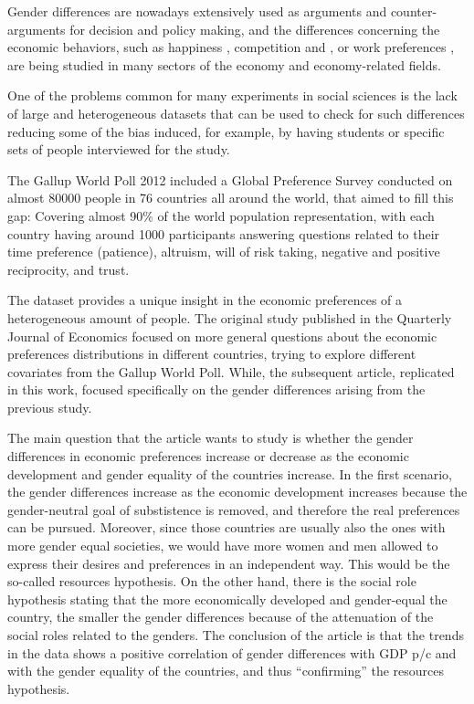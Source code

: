 \documentclass[
  11pt,
]{article}
\begin{document}
Gender differences are nowadays extensively used as arguments and
counter-arguments for decision and policy making, and the differences
concerning the economic behaviors, such as happiness \autocite{SPSU},
competition \autocite{CG} and \autocite{GLL}, or work preferences
\autocite{BG}, are being studied in many sectors of the economy and
economy-related fields.

One of the problems common for many experiments in social sciences is
the lack of large and heterogeneous datasets that can be used to check
for such differences reducing some of the bias induced, for example, by
having students or specific sets of people interviewed for the study.

The Gallup World Poll 2012 included a Global Preference Survey conducted
on almost 80000 people in 76 countries all around the world, that aimed
to fill this gap: Covering almost 90\% of the world population
representation, with each country having around 1000 participants
answering questions related to their time preference (patience),
altruism, will of risk taking, negative and positive reciprocity, and
trust.

The dataset provides a unique insight in the economic preferences of a
heterogeneous amount of people. The original study published in the
Quarterly Journal of Economics \autocite[133 (4)
pp.~1645-1692]{QJE_Falk} focused on more general questions about the
economic preferences distributions in different countries, trying to
explore different covariates from the Gallup World Poll. While, the
subsequent article, replicated in this work, focused specifically on the
gender differences arising from the previous study.

The main question that the article wants to study is whether the gender
differences in economic preferences increase or decrease as the economic
development and gender equality of the countries increase. In the first
scenario, the gender differences increase as the economic development
increases because the gender-neutral goal of substistence is removed,
and therefore the real preferences can be pursued. Moreover, since those
countries are usually also the ones with more gender equal societies, we
would have more women and men allowed to express their desires and
preferences in an independent way. This would be the so-called resources
hypothesis. On the other hand, there is the social role hypothesis
stating that the more economically developed and gender-equal the
country, the smaller the gender differences because of the attenuation
of the social roles related to the genders. The conclusion of the
article is that the trends in the data shows a positive correlation of
gender differences with GDP p/c and with the gender equality of the
countries, and thus ``confirming'' the resources hypothesis.
\end{document}
